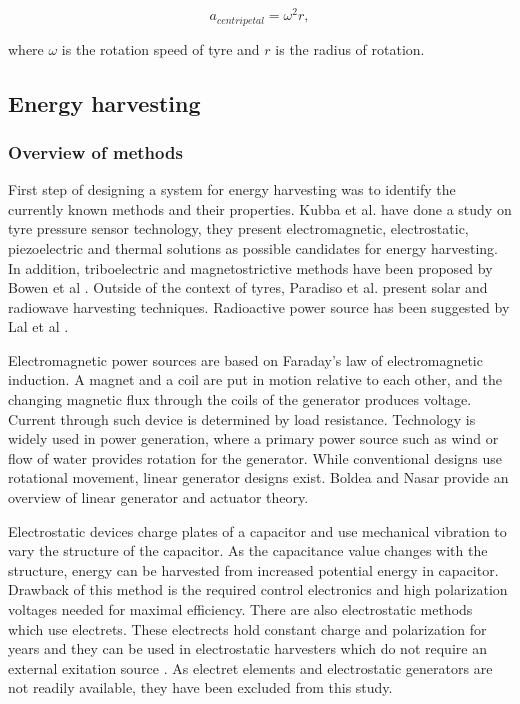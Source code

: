 \begin{equation}
  a_{centripetal} = \omega^2 r,
\end{equation}

where $\omega$ is the rotation speed of tyre and $r$ is the radius of rotation.

\subsection{Energy harvesting}
\subsubsection{Overview of methods}
First step of designing a system for energy harvesting was to identify the currently known methods and their properties. Kubba et al. \cite{Kubba2014} have done a study on tyre pressure sensor technology, they present electromagnetic, electrostatic, piezoelectric and thermal solutions as possible candidates for energy harvesting. In addition, triboelectric and magnetostrictive methods have been proposed by Bowen et al \cite{Bowen2014}. Outside of the context of tyres, Paradiso et al. \cite{Paradiso2005} present solar and radiowave harvesting techniques. Radioactive power source has been suggested by Lal et al \cite{Lal2004}. 

Electromagnetic power sources are based on Faraday's law of electromagnetic induction. A magnet and a coil are put in motion relative to each other, and the changing magnetic flux through the coils of the generator produces voltage. Current through such device is determined by load resistance. Technology is widely used in power generation, where a primary power source such as wind or flow of water provides rotation for the generator. While conventional designs use rotational movement, linear generator designs exist. Boldea and Nasar \cite{Boldea1999} provide an overview of linear generator and actuator theory. 

Electrostatic devices charge plates of a capacitor and use mechanical vibration to vary the structure of the capacitor. As the capacitance value changes with the structure, energy can be harvested from increased potential energy in capacitor. Drawback of this method is the required control electronics and high polarization voltages needed for maximal efficiency. There are also electrostatic methods which use electrets. These electrects hold constant charge and polarization for years and they can be used in electrostatic harvesters which do not require an external exitation source \cite{Boisseau2012}. As electret elements and electrostatic generators are not readily available, they have been excluded from this study.


